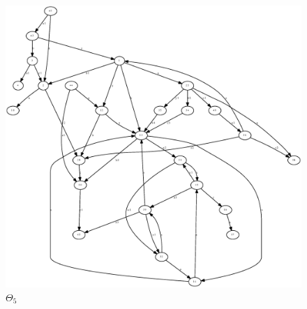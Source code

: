 \documentclass[a4paper,12pt]{article}
\numberwithin{equation}{section}
\numberwithin{figure}{section}
\begin{document}
\begin{figure}
\begin{center}
\includegraphics[scale=0.5, bb=36 36 892 854]{python/ex_K_f5.eps}
\caption{$\Theta_5$}
\label{fig:K_f5}
\end{center}
\end{figure}
\end{document}
